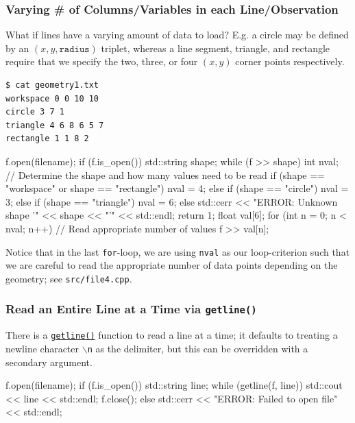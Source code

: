 \documentclass[12pt,letterpaper,twoside]{article}
\begin{document}
\subsubsection{Varying \# of Columns/Variables in each Line/Observation}
What if lines have a varying amount of data to load? E.g. a circle may be defined by an 
$(x,y, \texttt{radius})$ triplet, whereas a line segment, triangle, and rectangle 
require that we 
specify the two, three, or four $(x,y)$ corner points respectively.

{\small
\begin{verbatim}
$ cat geometry1.txt
workspace 0 0 10 10
circle 3 7 1
triangle 4 6 8 6 5 7
rectangle 1 1 8 2
\end{verbatim}
}

{\small
\begin{cpp}
f.open(filename);
if (f.is_open()) {
  std::string shape;
  while (f >> shape) {
    int nval;
    // Determine the shape and how many values need to be read
    if (shape == "workspace" or shape == "rectangle") nval = 4;
    else if (shape == "circle")                       nval = 3;
    else if (shape == "triangle")                     nval = 6;
    else {
      std::cerr << "ERROR: Unknown shape '" << shape << "'" << std::endl;
      return 1;
    }
    float val[6];
    for (int n = 0; n < nval; n++)    // Read appropriate number of values
      f >> val[n];
  }
}  
\end{cpp}
}

Notice that in the last \texttt{for}-loop, we are using \texttt{nval} as 
our loop-criterion such that we are careful to read the appropriate number of data points
depending on the geometry; see \texttt{src/file4.cpp}.

\subsubsection{Read an Entire Line at a Time via \texttt{getline()}}
There is a \href{https://en.cppreference.com/w/cpp/string/basic_string/getline}{\texttt{getline()}} function to read a line at a time; it defaults to treating a newline character 
\texttt{$\backslash$n} as the delimiter, but this can be overridden with a secondary argument.
\begin{cpp}
f.open(filename);
if (f.is_open()) {
  std::string line;
  while (getline(f, line))
    std::cout << line << std::endl;
  f.close();
}
else {
  std::cerr << "ERROR: Failed to open file" << std::endl;
}
\end{cpp}
\end{document}
